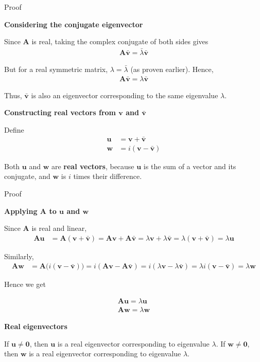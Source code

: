 \documentclass{beamer}
\numberwithin{equation}{section}
\theoremstyle{remark}
\let\vec\mathbf
\begin{document}
\begin{frame}{Proof}

\textbf{Considering the conjugate eigenvector}

Since $\vec{A}$ is real, taking the complex conjugate of both sides gives
\begin{align}
\vec{A}\bar{\vec{v}} = \bar{\lambda} \bar{\vec{v}}
\end{align}

But for a real symmetric matrix, $\lambda = \bar{\lambda}$ (as proven earlier). Hence,
\begin{align}
\vec{A}\bar{\vec{v}} = \lambda \bar{\vec{v}}
\end{align}

Thus, $\bar{\vec{v}}$ is also an eigenvector corresponding to the same eigenvalue $\lambda$.

\bigskip

\textbf{Constructing real vectors from $\vec{v}$ and $\bar{\vec{v}}$}

Define
\begin{align}
\vec{u} &= \vec{v} + \bar{\vec{v}}\\
\vec{w} &= i(\vec{v} - \bar{\vec{v}})
\end{align}

Both $\vec{u}$ and $\vec{w}$ are \textbf{real vectors}, because $\vec{u}$ is the sum of a vector and its conjugate, and $\vec{w}$ is $i$ times their difference.

\bigskip
\end{frame}

\begin{frame}{Proof}

\textbf{Applying $\vec{A}$ to $\vec{u}$ and $\vec{w}$}

Since $\vec{A}$ is real and linear,
\begin{align}
\vec{A}\vec{u} &= \vec{A}(\vec{v} + \bar{\vec{v}}) = \vec{A}\vec{v} + \vec{A}\bar{\vec{v}} = \lambda \vec{v} + \lambda \bar{\vec{v}} = \lambda (\vec{v} + \bar{\vec{v}}) = \lambda \vec{u}
\end{align}

Similarly,
\begin{align}
\vec{A}\vec{w} &= \vec{A}\big(i(\vec{v} - \bar{\vec{v}})\big) = i(\vec{A}\vec{v} - \vec{A}\bar{\vec{v}}) = i(\lambda \vec{v} - \lambda \bar{\vec{v}}) = \lambda i(\vec{v} - \bar{\vec{v}}) = \lambda \vec{w}
\end{align}

Hence we get 

\begin{align}
  \vec{A}\vec{u}=\lambda\vec{u}\\
  \vec{A}\vec{w}=\lambda\vec{w}
\end{align}
\bigskip

\textbf{Real eigenvectors}

If $\vec{u} \ne \vec{0}$, then $\vec{u}$ is a real eigenvector corresponding to eigenvalue $\lambda$.  
If $\vec{w} \ne \vec{0}$, then $\vec{w}$ is a real eigenvector corresponding to eigenvalue $\lambda$.  

\end{frame}
\end{document}
